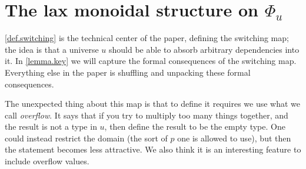 \documentclass[11pt, one side, article]{memoir}
\theoremstyle{definition}
\theoremstyle{plain}
\newcommand{\0}{\textsf{0}}
\newcommand{\1}{\tn{\textsf{1}}}
\begin{document}
\section{The lax monoidal structure on $\Phi_u$}

\cref{def.switching} is the technical center of the paper, defining the switching map; the idea is that a universe $u$ should be able to absorb arbitrary dependencies into it. In \cref{lemma.key} we will capture the formal consequences of the switching map. Everything else in the paper is shuffling and unpacking these formal consequences. 

The unexpected thing about this map is that to define it requires we use what we call \emph{overflow}. It says that if you try to multiply too many things together, and the result is not a type in $u$, then define the result to be the empty type. One could instead restrict the domain (the sort of $p$ one is allowed to use), but then the statement becomes less attractive. We also think it is an interesting feature to include overflow values.
\end{document}

